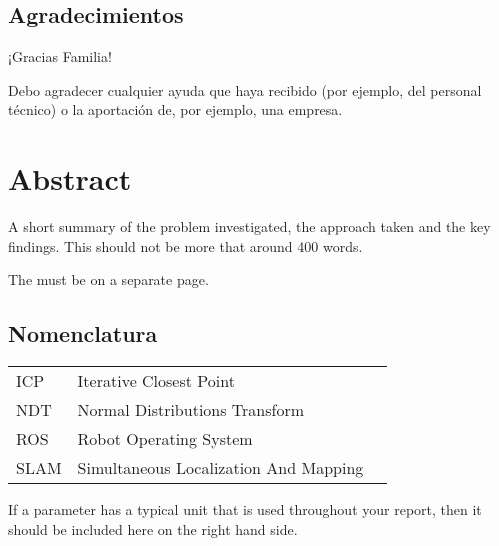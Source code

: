 \documentclass[a4paper,oneside,12pt]{book}
\title{\thesistitle}
\author{\authorname}
\begin{document}



\section*{\Huge{Agradecimientos}}
¡Gracias Familia!

Debo agradecer cualquier ayuda que haya recibido (por ejemplo, del personal técnico) o la aportación de, por ejemplo, una empresa.

\newpage
\chapter*{Abstract}
A short summary of the problem investigated, the approach taken and the key findings. This should not be more that around 400 words.

The must be on a separate page.


\renewcommand*\contentsname{Contenido}
\renewcommand{\listfigurename}{Lista de Figuras}
\renewcommand{\listtablename}{Lista de Tablas}
\tableofcontents
\listoffigures
\listoftables
\newpage
\section*{\Huge{Nomenclatura}}
\begin{tabular}{lp{9cm}l}
ICP & Iterative Closest Point \\
NDT & Normal Distributions Transform \\
ROS & Robot Operating System \\
SLAM & Simultaneous Localization And Mapping\\
\end{tabular}
\vspace{2cm}

If a parameter has a typical unit that is used throughout your report, then it should be included here on the right hand side.


\mainmatter
%




%

\renewcommand{\bibname}{Referencias Bibliográficas}



%
%
\appendix
\renewcommand{\thechapter}{A\arabic{chapter}}

\end{document}

